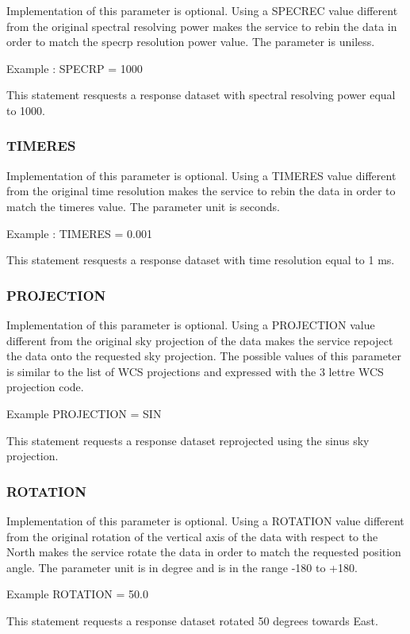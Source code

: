 \documentclass[11pt,a4paper]{ivoa}
\begin{document}
Implementation of this parameter is optional. Using a SPECREC value different from the original spectral resolving power makes the service to rebin the data in order to match the specrp resolution power value. The parameter is uniless.  

Example : SPECRP = 1000  

This statement resquests a response dataset with spectral resolving power  equal to 1000.

\subsubsection{TIMERES}

Implementation of this parameter is optional. Using a TIMERES value different from the original time resolution  makes the service to rebin the data in order to match the timeres value. The parameter unit is seconds.  

Example : TIMERES = 0.001  

This statement resquests a response dataset with time resolution equal to 1 ms.

\subsubsection{PROJECTION}

Implementation of this parameter is optional. Using a PROJECTION value different from the original sky projection of the data makes the service repoject the data onto the requested sky projection. The possible values of this parameter is similar to the list of WCS projections and expressed with the 3 lettre WCS projection code.

Example PROJECTION = SIN

This statement requests a response dataset reprojected using the sinus sky projection.

\subsubsection{ROTATION}

Implementation of this parameter is optional. Using a ROTATION value different from the original rotation of the vertical axis of the data with respect to the North makes the service rotate the data in order to match  the requested position angle. The  parameter unit is in degree and is in the range -180 to +180.

Example ROTATION = 50.0

This statement requests a response dataset rotated 50 degrees towards East.
\end{document}

